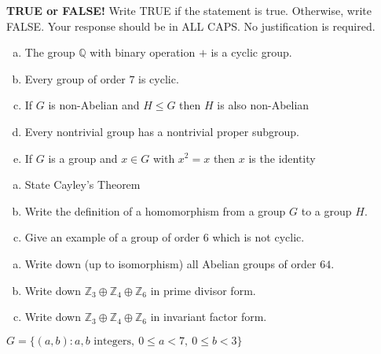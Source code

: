 \documentclass[11pt]{exam}
\theoremstyle{definition}
\begin{document}
\begin{questions}

\addpoints

\question[10]\mbox{}
\textbf{TRUE or FALSE!}  Write  TRUE if the statement is true.  Otherwise, write FALSE.  Your response should be in ALL CAPS.  No justification is required.
\begin{enumerate}[(a)]
\item  The group $\mathbb Q$ with binary operation $+$ is a cyclic group.
\vspace{1.3in}
\item  Every group of order $7$ is cyclic.
\vspace{1.3in}
\item  If $G$ is non-Abelian and $H\leq G$ then $H$ is also non-Abelian
\vspace{1.3in}
\item  Every nontrivial group has a nontrivial proper subgroup.
\vspace{1.3in}
\item  If $G$ is a group and $x\in G$ with $x^2 = x$ then $x$ is the identity
\vspace{1.3in}
\end{enumerate}

\newpage
\question[10]\mbox{}
\begin{enumerate}[(a)]
\item  State Cayley's Theorem
\vspace{2in}
\item  Write the definition of a homomorphism from a group $G$ to a group $H$.
\vspace{2in}
\item  Give an example of a group of order $6$ which is not cyclic.
\end{enumerate}

\newpage
\question[10]\mbox{}
\begin{enumerate}[(a)]
\item  Write down (up to isomorphism) all Abelian groups of order $64$.
\vspace{2.5in}
\item Write down $\mathbb Z_3\oplus \mathbb Z_4\oplus \mathbb Z_6$ in prime divisor form.
\vspace{2.5in}
\item Write down $\mathbb Z_3\oplus \mathbb Z_4\oplus \mathbb Z_6$ in invariant factor form.
\end{enumerate}

\newpage
\question[10]\mbox{}
$G=\{(a,b): \text{$a,b$ integers},\ 0\leq a < 7,\ 0\leq b < 3\}$


\end{questions}
\end{document}
